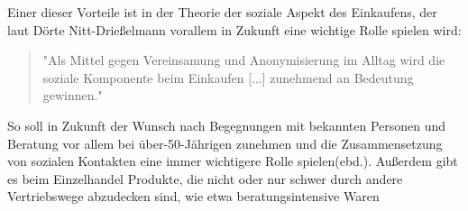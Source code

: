Einer dieser Vorteile ist in der Theorie der soziale Aspekt des Einkaufens, der laut Dörte Nitt-Drießelmann vorallem in Zukunft eine wichtige Rolle spielen wird:
\begin{quote}
"Als Mittel gegen Vereinsamung und Anonymisierung im Alltag wird die soziale Komponente beim Einkaufen [...] zunehmend an Bedeutung gewinnen."\cite[S. 43]{Nitt}
\end{quote} 
So soll in Zukunft der Wunsch nach Begegnungen mit bekannten Personen und Beratung vor allem bei über-50-Jährigen zunehmen und die Zusammensetzung von sozialen Kontakten eine immer wichtigere Rolle spielen(ebd.).
Außerdem gibt es beim Einzelhandel Produkte, die nicht oder nur schwer durch andere Vertriebswege abzudecken sind, wie etwa beratungsintensive Waren


